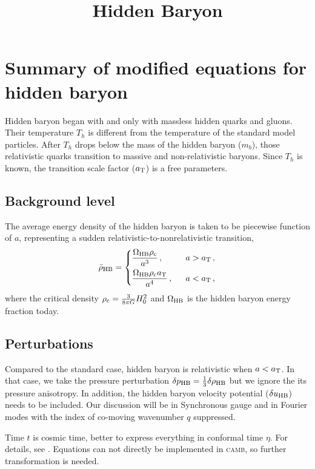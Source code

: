 \documentclass[preprint,nofootinbib,aps,prd,showpacs,superscriptaddress,groupedaddress,amsmath,longbibliography]{revtex4-1}
\begin{document}
\title{Hidden Baryon}
\date{}

\section{Summary of modified equations for hidden baryon}
Hidden baryon began with and only with massless hidden quarks and gluons. Their temperature $T_h$ is different from the temperature of the standard model particles. After $T_h$ drops below the mass of the hidden baryon ($m_b$), those relativistic quarks transition to massive and non-relativistic baryons. Since $T_h$ is known, the transition scale factor ($a_{\rm{T}}$) is a free parameters. 
\subsection{Background level}
The average energy density of the hidden baryon is taken to be piecewise function of $a$, representing a sudden relativistic-to-nonrelativistic transition,
\begin{equation}\label{eq:HDM-density}
    \bar{\rho}_{\rm{HB}} = 
    \begin{dcases} 
      \frac{\Omega_{\rm{HB}}\rho_{\rm{c}}}{a^3}\,, & ~~a > a_{\rm{T}}\,, \\
      \frac{\Omega_{\rm{HB}}\rho_{\rm{c}}a_{\rm{T}}}{a^4}\,, & ~~a < a_{\rm{T}}\,,
   \end{dcases}
\end{equation}
where the critical density $\rho_{\rm{c}}=\frac{3}{8\pi G}H_0^2$ and $\Omega_{\rm{HB}}$ is the hidden baryon energy fraction today.

\subsection{Perturbations}
Compared to the standard case, hidden baryon is relativistic when $a<a_{\rm{T}}$. In that case, we take the pressure perturbation $\delta p_{\rm{HB}} = \frac{1}{3}\delta \rho_{\rm{HB}}$ but we ignore the its pressure anisotropy. In addition, the hidden baryon velocity potential ($\delta u_{\rm{HB}}$) needs to be included. Our discussion will be in Synchronous gauge and in Fourier modes with the index of co-moving wavenumber $q$ suppressed.

Time $t$ is cosmic time, better to express everything in conformal time $\eta$.  For details, see \cite[CH 6]{S.W.cosmo.}. Equations can not directly be implemented in \textsc{camb}, so further transformation is needed.
\end{document}

